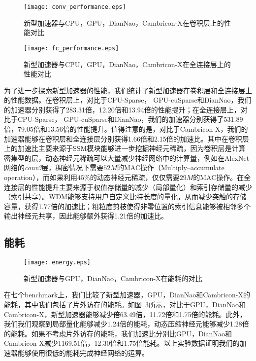 \begin{figure}[h]
\centering
\texttt{[image: conv\_performance.eps]}
\caption{新型加速器与CPU，GPU，DianNao，Cambricon-X在卷积层上的性能对比}
\label{fig:conv_performance}
\end{figure}

\begin{figure}[h]
\centering
\texttt{[image: fc\_performance.eps]}
\caption{新型加速器与CPU，GPU，DianNao，Cambricon-X在全连接层上的性能对比}
\label{fig:fc_performance}
\end{figure}

为了进一步探索新型加速器的性能，我们统计了新型加速器在卷积层和全连接层上的性能数据。在卷积层上，对比于CPU-Sparse， GPU-cuSparse和DianNao，我们的加速器分别获得了283.31倍，12.20倍和13.94倍的性能提升；在全连接层上，对比于CPU-Sparse， GPU-cuSparse和DianNao，我们的加速器分别获得了531.89倍，79.05倍和13.56倍的性能提升。值得注意的是，对比于Cambricon-X，我们的加速器能够在卷积层和全连接层分别获得1.66倍和2.15倍的加速比。其中在卷积层上的加速比主要来源于SSM模块能够进一步挖掘神经元稀疏，因为卷积层是计算密集型的层，动态神经元稀疏可以大量减少神经网络中的计算量，例如在AlexNet网络的\emph{conv3}层，稠密情况下需要$52M$的MAC操作（Multiply–accumulate operation），而如果利用$45\%$的动态神经元稀疏，仅仅需要$29M$的MAC操作。在全连接层的性能提升主要来源于权值存储量的减少（局部量化）和索引存储量的减少（索引共享）。WDM能够支持用户自定义比特长度的量化，从而减少突触的存储容量，获得1.77倍的加速比；粗粒度剪枝使得非零位置的索引信息能够被相邻多个输出神经元共享，因此能够额外获得1.21倍的加速比。


\subsection{能耗}
\begin{figure}[h]
\centering
\texttt{[image: energy.eps]}
\caption{新型加速器与GPU，DianNao，Cambricon-X在能耗的对比}
\label{fig:energy}
\end{figure}

在七个benchmark上，我们比较了新型加速器，GPU，DianNao和Cambricon-X的能耗，其中我们包括了片外访存的能耗。如图~\ref{fig:energy}所示，对比于GPU，DianNao和Cambricon-X，新型加速器能够减少倍63.49倍，11.72倍和1.75倍的能耗。此外，我们我们观察到局部量化能够减少1.24倍的能耗，动态压缩神经元能够减少1.28倍的能耗。如果不考虑片外访存的能耗，我们加速比分别比GPU，DianNao和Cambricon-X减少1169.51倍，12.30倍和1.75倍能耗。以上实验数据证明我们的加速器能够使用很低的能耗完成神经网络的运算。


